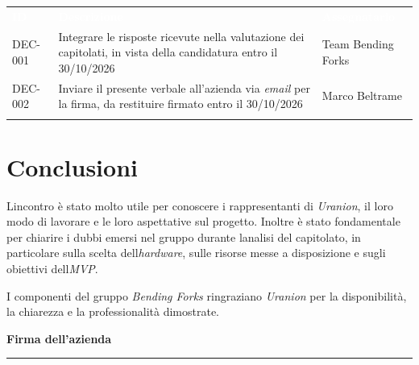 \documentclass[12pt,a4paper]{article}
\begin{document}
\begin{center}
\begin{tabularx}{\linewidth}{>{\hsize=0.511\hsize\raggedright\arraybackslash}X>{\hsize=1.675\hsize\raggedright\arraybackslash}X>{\hsize=0.814\hsize\raggedright\arraybackslash}X}
\rowcolor{bfblue}\textcolor{white}{\textbf{ID}} & \textcolor{white}{\textbf{Descrizione}} & \textcolor{white}{\textbf{Assegnatario}} \\
DEC-001 & Integrare le risposte ricevute nella valutazione dei capitolati, in vista della candidatura entro il 30/10/2026 & Team Bending Forks \\ \arrayrulecolor{bfline}\hline
DEC-002 & Inviare il presente verbale all'azienda via \emph{email} per la firma, da restituire firmato entro il 30/10/2026 & Marco Beltrame \\ \arrayrulecolor{bfline}\hline
\end{tabularx}
\end{center}

\hypertarget{conclusioni}{%
\section{Conclusioni}}

L\textquotesingle incontro è stato molto utile per conoscere i rappresentanti di \emph{Uranion}, il loro modo di lavorare e le loro aspettative sul progetto. Inoltre è stato fondamentale per chiarire i dubbi emersi nel gruppo durante l\textquotesingle analisi del capitolato, in particolare sulla scelta dell\textquotesingle{}\emph{hardware}, sulle risorse messe a disposizione e sugli obiettivi dell\textquotesingle{}\emph{MVP}.

I componenti del gruppo \emph{Bending Forks} ringraziano \emph{Uranion} per la disponibilità, la chiarezza e la professionalità dimostrate.

\vspace{30pt}
\begin{flushright}
\textbf{Firma dell'azienda}\\[22pt]
\rule{60mm}{0.5pt}
\end{flushright}
\end{document}
